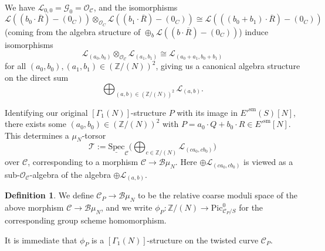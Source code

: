 \documentclass[11pt]{amsart}
\theoremstyle{definition}
\newtheorem{definition}[subsection]{Definition}
\begin{document}
We have ${\mathcal{L}}_{0,0} = {\mathcal{G}}_0 = {\mathcal{O}}_{\mathcal{C}}$, and the isomorphisms 
\begin{displaymath}
{\mathcal{L}}((b_0 \cdot \overline{R}) - (0_C)) \otimes_{{\mathcal{O}}_C} {\mathcal{L}}((b_1 \cdot \overline{R}) - (0_C)) \cong {\mathcal{L}}(((b_0 + b_1) \cdot \overline{R}) - (0_C))
\end{displaymath}
(coming from the algebra structure of $\oplus_b {\mathcal{L}}((b\cdot \overline{R}) - (0_C))$) induce isomorphisms 
\begin{displaymath}
{\mathcal{L}}_{(a_0,b_0)} \otimes_{{\mathcal{O}}_{\mathcal{C}}} {\mathcal{L}}_{(a_1,b_1)} \cong {\mathcal{L}}_{(a_0+a_1,b_0+b_1)}
\end{displaymath}
for all $(a_0,b_0),(a_1,b_1) \in (\mathbb{Z}/(N))^2$, giving us a canonical algebra structure on the direct sum 
\begin{displaymath}
\bigoplus_{(a,b) \in (\mathbb{Z}/(N))^2} {\mathcal{L}}_{(a,b)}.
\end{displaymath}

Identifying our original $[\Gamma_1(N)]$-structure $P$ with its image in $E'^{\mathrm{sm}}(S)[N]$, there exists some $(a_0,b_0) \in (\mathbb{Z}/(N))^2$ with $P = a_0\cdot Q + b_0\cdot R \in E'^{\mathrm{sm}}[N]$. This determines a $\mu_N$-torsor 
\begin{displaymath}
{\mathcal{T}} := \underline{\mathrm{Spec}}_{\mathcal{C}} \big( \bigoplus_{c \in \mathbb{Z}/(N)} {\mathcal{L}}_{(ca_0,cb_0)} \big) 
\end{displaymath}
over ${\mathcal{C}}$, corresponding to a morphism ${\mathcal{C}} \rightarrow {\mathcal{B}} \mu_N$. Here $\oplus {\mathcal{L}}_{(ca_0,cb_0)}$ is viewed as a sub-${\mathcal{O}}_{\mathcal{C}}$-algebra of the algebra $\oplus {\mathcal{L}}_{(a,b)}$.
\begin{definition}
We define ${\mathcal{C}}_P \rightarrow {\mathcal{B}}\mu_N$ to be the relative coarse moduli space of the above morphism ${\mathcal{C}} \rightarrow {\mathcal{B}} \mu_N$, and we write $\phi_P: \mathbb{Z}/(N) \rightarrow \mathrm{Pic}^0_{{\mathcal{C}}_P/S}$ for the corresponding group scheme homomorphism.
\end{definition}

It is immediate that $\phi_P$ is a $[\Gamma_1(N)]$-structure on the twisted curve ${\mathcal{C}}_P$. 
\end{document}
